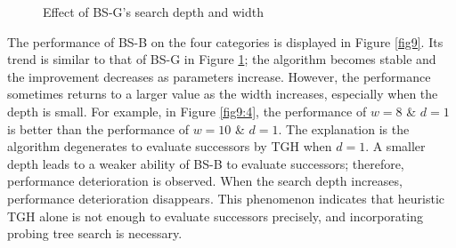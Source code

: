 \documentclass[review,3p,times,authoryear,12pt]{elsarticle}
\begin{document}
\begin{figure}[!htb]
\caption{Effect of BS-G's search depth and width}
\label{fig8}
\end{figure}

The performance of BS-B on the four categories is displayed in Figure \ref{fig9}. Its trend is similar to that of BS-G in Figure \ref{fig8}; the algorithm becomes stable and the improvement decreases as parameters increase.
However, the performance sometimes returns to a larger value as the width increases, especially when the depth is small.
For example, in Figure \ref{fig9:4}, the performance of $w=8$ \& $d=1$ is better than the performance of $w=10$ \& $d=1$.
The explanation is the algorithm degenerates to evaluate successors by TGH when $d=1$.
A smaller depth leads to a weaker ability of BS-B to evaluate successors; therefore, performance deterioration is observed.
When the search depth increases, performance deterioration disappears.
This phenomenon indicates that heuristic TGH alone is not enough to evaluate successors precisely, and incorporating probing tree search is necessary.
\end{document}
